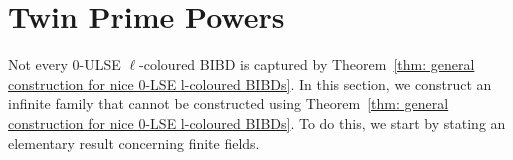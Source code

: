 \documentclass[12pt]{article}
\theoremstyle{definition}
\newtheorem{lemma}[theorem]{Lemma}
\begin{document}
\section{Twin Prime Powers}\label{sec: TPP Construction}

Not every $0$-ULSE $\ell$-coloured BIBD is captured by Theorem~\ref{thm: general construction for nice 0-LSE l-coloured BIBDs}. In this section, we construct an infinite family that cannot be constructed using Theorem~\ref{thm: general construction for nice 0-LSE l-coloured BIBDs}. To do this, we start by stating an elementary result concerning finite fields.

\end{document}
